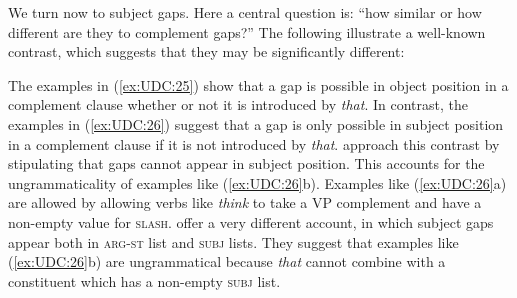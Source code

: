\documentclass[output=paper
                ,modfonts
                ,nonflat
	        ,collection
	        ,collectionchapter
	        ,collectiontoclongg
 	        ,biblatex
                ,babelshorthands
                ,newtxmath
                ,draftmode
                ,colorlinks, citecolor=brown
]{./langsci/langscibook}
\begin{document}
{%


We turn now to subject gaps. Here a central question is: ``how similar or
how different are they to complement gaps?'' The following illustrate a
well-known contrast, which suggests that they may be significantly
different:

\begin{exe} \ex \begin{xlist} \label{ex:UDC:25}

\end{xlist}
\end{exe}

\begin{exe} \ex \begin{xlist} \label{ex:UDC:26}

\end{xlist}
\end{exe}

\noindent
The examples in (\ref{ex:UDC:25}) show that a gap is possible in
object position in a complement clause whether or not it is introduced
by \emph{that}. In contrast, the examples in (\ref{ex:UDC:26}) suggest
that a gap is only possible in subject position in a complement clause
if it is not introduced by \emph{that}. \citet{Pollard:Sag:94}
approach this contrast by stipulating that gaps cannot appear in
subject position. This accounts for the ungrammaticality of examples
like (\ref{ex:UDC:26}b). Examples like (\ref{ex:UDC:26}a) are allowed
by allowing verbs like \textit{think} to take a VP complement and have a
non-empty value for \textsc{slash}. \citet{Ginzburg:Sag:01} offer a very
different account, in which subject gaps appear both in \textsc{arg-st} list
and \textsc{subj} lists. They suggest that examples like (\ref{ex:UDC:26}b) are
ungrammatical because \emph{that} cannot combine with a constituent
which has a non-empty \textsc{subj} list.

}
\end{document}
